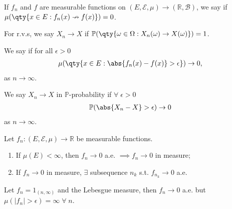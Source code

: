 \begin{definition}
	If $f_n$ and $f$ are measurable functions on $(E,\mathcal E,\mu) \to (\mathbb{R}, \mathcal{B})$, we say  if $\mu(\qty{x \in E : f_n(x) \nrightarrow f(x)}) = 0$.

	For r.v.s, we say $X_n \to X$  if $\mathbb{P}(\qty{\omega \in \Omega : X_n(\omega) \to X(\omega)}) = 1$.
\end{definition}

\begin{definition}
	We say  if for all $\epsilon > 0$
	\begin{align*}
		\mu(\qty{x\in E : \abs{f_n(x) - f(x)} > \epsilon}) \to 0,
	\end{align*} as $n \to \infty$.

	We say $X_n \to X$ in $\mathbb{P}$-probability if $\forall \; \epsilon > 0$
	\begin{align*}
		\mathbb{P}(\abs{X_n - X} > \epsilon) \to 0
	\end{align*} as $n \to \infty$.
\end{definition}

\begin{theorem}
	Let $f_n \colon (E,\mathcal E,\mu) \to \mathbb R$ be measurable functions.
	\begin{enumerate}
		\item If $\mu(E) < \infty$, then $f_n \to 0$ a.e. $\implies f_n \to 0$ in measure;
		\item If $f_n \to 0$ in measure, $\exists$ subsequence $n_k$ s.t. $f_{n_k} \to 0$ a.e.
	\end{enumerate}
\end{theorem}

\begin{example}
	Let $f_n = 1_{(n, \infty)}$ and the Lebesgue measure, then $f_n \to 0$ a.e. but $\mu(|f_n| > \epsilon) = \infty \; \forall \; n$.
\end{example}

